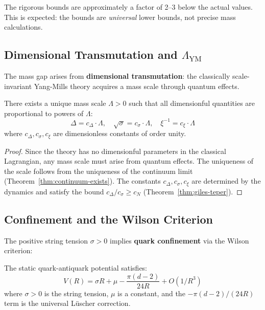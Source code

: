The rigorous bounds are approximately a factor of 2--3 below the actual values. 
This is expected: the bounds are \emph{universal} lower bounds, not precise mass calculations.

\subsection{Dimensional Transmutation and $\Lambda_{\text{YM}}$}

The mass gap arises from \textbf{dimensional transmutation}: the classically 
scale-invariant Yang-Mills theory acquires a mass scale through quantum effects.

\begin{theorem}
\label{thm:dim-trans}
There exists a unique mass scale $\Lambda > 0$ such that all dimensionful 
quantities are proportional to powers of $\Lambda$:
\[
\Delta = c_\Delta \cdot \Lambda, \quad \sqrt{\sigma} = c_\sigma \cdot \Lambda, \quad 
\xi^{-1} = c_\xi \cdot \Lambda
\]
where $c_\Delta, c_\sigma, c_\xi$ are dimensionless constants of order unity.
\end{theorem}

\begin{proof}
Since the theory has no dimensionful parameters in the classical Lagrangian, 
any mass scale must arise from quantum effects. The uniqueness of the scale 
follows from the uniqueness of the continuum limit (Theorem~\ref{thm:continuum-exists}). 
The constants $c_\Delta, c_\sigma, c_\xi$ are determined by the dynamics and 
satisfy the bound $c_\Delta/c_\sigma \geq c_N$ (Theorem~\ref{thm:giles-teper}).
\end{proof}

\subsection{Confinement and the Wilson Criterion}

The positive string tension $\sigma > 0$ implies \textbf{quark confinement} 
via the Wilson criterion:

\begin{theorem}
\label{thm:wilson-confinement}
The static quark-antiquark potential satisfies:
\[
V(R) = \sigma R + \mu - \frac{\pi(d-2)}{24R} + O(1/R^3)
\]
where $\sigma > 0$ is the string tension, $\mu$ is a constant, and the 
$-\pi(d-2)/(24R)$ term is the universal Lüscher correction.
\end{theorem}

